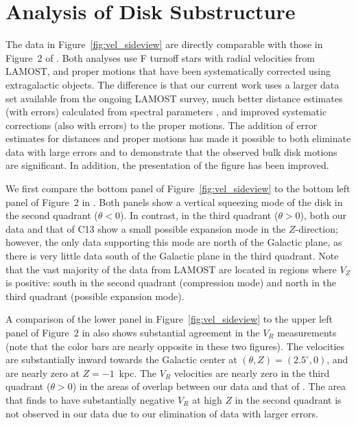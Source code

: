 \documentclass[11pt,preprint]{aastex6}
\begin{document}

\section{Analysis of Disk Substructure}
 
The data in Figure~\ref{fig:vel_sideview} are directly comparable with those in Figure~2 of \citet[][hereafter ]{Carlin2013}.  Both analyses use F turnoff stars with radial velocities from LAMOST, and proper motions that have been systematically corrected using extragalactic objects.  The difference is that our current work uses a larger data set available from the ongoing LAMOST survey,  much better distance estimates (with errors) calculated from spectral parameters \citep{Carlin2015}, and improved systematic corrections (also with errors) to the proper motions.  The addition of error estimates for distances and proper motions has made it possible to both eliminate data with large errors and to demonstrate that the observed bulk disk motions are significant.  In addition, the presentation of the figure has been improved.
 
We first compare the bottom panel of Figure~\ref{fig:vel_sideview} to the bottom left panel of Figure~2 in .  Both panels show a vertical squeezing mode of the disk in the second quadrant ($\theta<0$). In contrast, in the third quadrant ($\theta>0$), both our data and that of C13 show a small possible expansion mode in the $Z$-direction; however, the only data supporting this mode are north of the Galactic plane, as there is very little data south of the Galactic plane in the third quadrant. Note that the vast majority of the data from LAMOST are located in regions where $V_Z$ is positive: south in the second quadrant (compression mode) and north in the third quadrant (possible expansion mode).
 
A comparison of the lower panel in Figure~\ref{fig:vel_sideview} to the upper left panel of Figure~2 in  also shows substantial agreement in the $V_R$ measurements (note that the color bars are nearly opposite in these two figures).  The velocities are substantially inward towards the Galactic center at $(\theta, Z)=(2.5^\circ, 0)$, and are nearly zero at $Z=-1$~kpc.  The $V_R$ velocities are nearly zero in the third quadrant ($\theta>0$) in the areas of overlap between our data and that of .  The area that  finds to have substantially negative $V_R$ at high $Z$ in the second quadrant is not observed in our data due to our elimination of data with larger errors.
 
\end{document}
